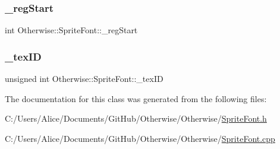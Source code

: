 \mbox{\label{class_otherwise_1_1_sprite_font_a87e10732d951b4909d976aad334534c2}} 
\subsubsection{\texorpdfstring{\+\_\+reg\+Start}{\_regStart}}
{\footnotesize\ttfamily int Otherwise\+::\+Sprite\+Font\+::\+\_\+reg\+Start\hspace{0.3cm}{\ttfamily [private]}}

\mbox{\label{class_otherwise_1_1_sprite_font_a17c16cdf59495a7082e68a81993999ac}} 
\subsubsection{\texorpdfstring{\+\_\+tex\+ID}{\_texID}}
{\footnotesize\ttfamily unsigned int Otherwise\+::\+Sprite\+Font\+::\+\_\+tex\+ID\hspace{0.3cm}{\ttfamily [private]}}



The documentation for this class was generated from the following files\+:\begin{DoxyCompactItemize}
\item 
C\+:/\+Users/\+Alice/\+Documents/\+Git\+Hub/\+Otherwise/\+Otherwise/\hyperlink{_sprite_font_8h}{Sprite\+Font.\+h}\item 
C\+:/\+Users/\+Alice/\+Documents/\+Git\+Hub/\+Otherwise/\+Otherwise/\hyperlink{_sprite_font_8cpp}{Sprite\+Font.\+cpp}\end{DoxyCompactItemize}
